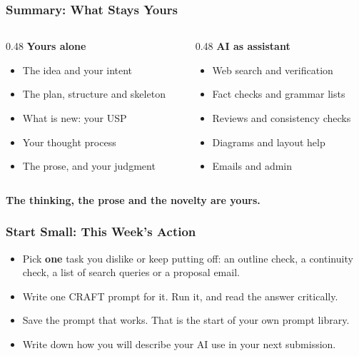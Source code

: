 \begin{frame}[fragile]\frametitle{Summary: What Stays Yours}
\begin{columns}
    \begin{column}[T]{0.48\linewidth}
    \textbf{Yours alone}
    \begin{itemize}
    \item The idea and your intent
    \item The plan, structure and skeleton
    \item What is new: your USP
    \item Your thought process
    \item The prose, and your judgment
    \end{itemize}
    \end{column}
    \begin{column}[T]{0.48\linewidth}
    \textbf{AI as assistant}
    \begin{itemize}
    \item Web search and verification
    \item Fact checks and grammar lists
    \item Reviews and consistency checks
    \item Diagrams and layout help
    \item Emails and admin
    \end{itemize}
    \end{column}
\end{columns}
\medskip
\begin{center}
\textbf{The thinking, the prose and the novelty are yours.}
\end{center}
\end{frame}

\begin{frame}[fragile]\frametitle{Start Small: This Week's Action}
\begin{itemize}
\item Pick \textbf{one} task you dislike or keep putting off: an outline check, a continuity check, a list of search queries or a proposal email.
\item Write one CRAFT prompt for it. Run it, and read the answer critically.
\item Save the prompt that works. That is the start of your own prompt library.
\item Write down how you will describe your AI use in your next submission.
\end{itemize}
\end{frame}
